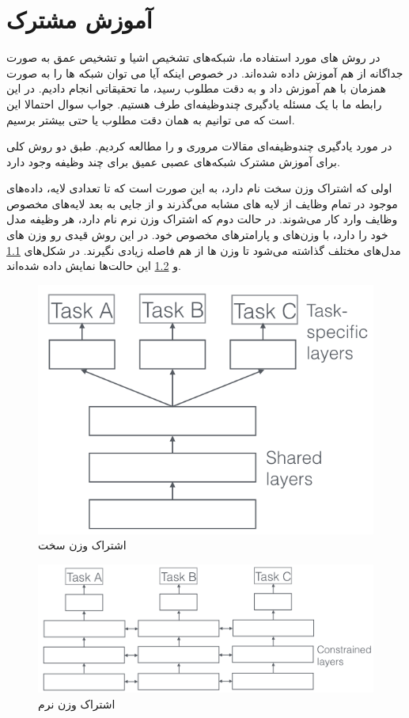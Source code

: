 \documentclass[12pt,a4paper]{report}
\begin{document}
\chapter{آموزش مشترک}
در روش های مورد استفاده ما، شبکه‌های تشخیص اشیا و تشخیص عمق به صورت جداگانه از هم آموزش داده شده‌اند.
در خصوص اینکه آیا می توان شبکه ها را به صورت همزمان با هم آموزش داد و به دقت مطلوب رسید،
ما تحقیقاتی انجام دادیم.
در این رابطه ما با یک مسئله یادگیری چندوظیفه‌ای
طرف هستیم.
جواب سوال احتمالا این است که می توانیم به همان دقت مطلوب یا حتی بیشتر برسیم.

در مورد یادگیری چندوظیفه‌ای مقالات مروری \cite{ruder2017overview} و \cite{zhang} را مطالعه کردیم.
طبق \cite{ruder2017overview} دو روش کلی برای آموزش مشترک شبکه‌های عصبی عمیق برای چند وظیفه وجود دارد.

اولی که اشتراک وزن سخت نام دارد، به این صورت است که تا تعدادی لایه، داده‌های موجود
در تمام وظایف از لایه های مشابه می‌گذرند و از جایی به بعد لایه‌های مخصوص وظایف وارد کار می‌شوند.
در حالت دوم که اشتراک وزن نرم نام دارد، هر وظیفه مدل خود را دارد، با وزن‌های و پارامترهای مخصوص خود.
در این روش قیدی رو وزن های مدل‌های مختلف گذاشته می‌شود تا وزن ها از هم فاصله زیادی نگیرند.
در شکل‌های \ref{joint_hard} و \ref{joint_soft} این حالت‌ها نمایش داده شده‌اند.
\begin{figure}[h]
  \centering
  \includegraphics[width=.5\textwidth]{Images//joint1.png}
  \caption{اشتراک وزن سخت}\label{joint_hard}
\end{figure}
\begin{figure}[h]
  \centering
  \includegraphics[width=.5\textwidth]{Images//joint2.png}
  \caption{اشتراک وزن نرم}\label{joint_soft}
\end{figure}
\end{document}
